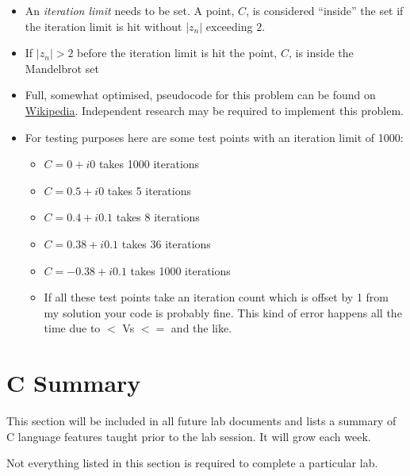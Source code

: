\documentclass{lab}
\begin{document}
\begin{itemize}[itemsep=0mm]
\item An \textit{iteration limit} needs to be set. A point, $C$, is considered ``inside'' the set if the iteration limit is hit without $\left|z_n\right|$ exceeding $2$.
\item If $\left|z_n\right| > 2$ before the iteration limit is hit the point, $C$, is inside the Mandelbrot set
\item Full, somewhat optimised, pseudocode for this problem can be found on \underline{\href{https://en.wikipedia.org/wiki/Mandelbrot_set}{Wikipedia}}. Independent research may be required to implement this problem.
\item For testing purposes here are some test points with an iteration limit of 1000:
	\begin{itemize}
		\item $C = 0 + i0$ takes 1000 iterations
		\item $C = 0.5 + i0$ takes 5 iterations
		\item $C = 0.4 +i0.1$ takes 8 iterations
		\item $C = 0.38 +i0.1$ takes 36 iterations
		\item $C = -0.38 +i0.1$ takes 1000 iterations
		\item If all these test points take an iteration count which is offset by 1 from my solution your code is probably fine. This kind of error happens all the time due to $<$ Vs $<=$ and the like.
	\end{itemize}
\end{itemize}


\pagebreak 
\section{C Summary}
This section will be included in all future lab documents and lists a summary of C language features taught prior to the lab session. It will grow each week.

Not everything listed in this section is required to complete a particular lab.
\end{document}
